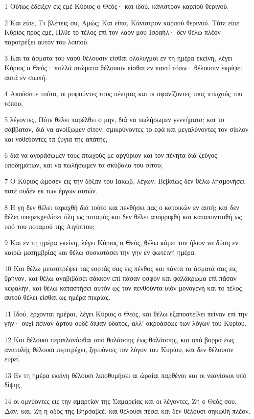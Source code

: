 \par 1 Ούτως έδειξεν εις εμέ Κύριος ο Θεός· και ιδού, κάνιστρον καρπού θερινού.
\par 2 Και είπε, Τι βλέπεις συ, Αμώς; Και είπα, Κάνιστρον καρπού θερινού. Τότε είπε Κύριος προς εμέ, Ήλθε το τέλος επί τον λαόν μου Ισραήλ· δεν θέλω πλέον παρατρέξει αυτόν του λοιπού.
\par 3 Και τα άσματα του ναού θέλουσιν είσθαι ολολυγμοί εν τη ημέρα εκείνη, λέγει Κύριος ο Θεός· πολλά πτώματα θέλουσιν είσθαι εν παντί τόπω· θέλουσιν εκρίψει αυτά εν σιωπή.
\par 4 Ακούσατε τούτο, οι ροφούντες τους πένητας και οι αφανίζοντες τους πτωχούς του τόπου,
\par 5 λέγοντες, Πότε θέλει παρέλθει ο μην, διά να πωλήσωμεν γεννήματα; και το σάββατον, διά να ανοίξωμεν σίτον, σμικρύνοντες το εφά και μεγαλύνοντες τον σίκλον και νοθεύοντες τα ζύγια της απάτης;
\par 6 διά να αγοράσωμεν τους πτωχούς με αργύριον και τον πένητα διά ζεύγος υποδημάτων, και να πωλήσωμεν τα σκύβαλα του σίτου;
\par 7 Ο Κύριος ώμοσεν εις την δόξαν του Ιακώβ, λέγων, Βεβαίως δεν θέλω λησμονήσει ποτέ ουδέν εκ των έργων αυτών.
\par 8 Η γη δεν θέλει ταραχθή διά τούτο και πενθήσει πας ο κατοικών εν αυτή; και δεν θέλει υπερεκχειλίσει όλη ως ποταμός και δεν θέλει απορριφθή και καταποντισθή ως υπό του ποταμού της Αιγύπτου;
\par 9 Και εν τη ημέρα εκείνη, λέγει Κύριος ο Θεός, θέλω κάμει τον ήλιον να δύση εν καιρώ μεσημβρίας και θέλω συσκοτάσει την γην εν φωτεινή ημέρα.
\par 10 Και θέλω μεταστρέψει τας εορτάς σας εις πένθος και πάντα τα άσματά σας εις θρήνον, και θέλω αναβιβάσει σάκκον επί πάσαν οσφύν και φαλάκρωμα επί πάσαν κεφαλήν, και θέλω καταστήσει αυτόν ως τον πενθούντα υιόν μονογενή και το τέλος αυτού θέλει είσθαι ως ημέρα πικρίας.
\par 11 Ιδού, έρχονται ημέραι, λέγει Κύριος ο Θεός, και θέλω εξαποστείλει πείναν επί την γήν· ουχί πείναν άρτου ουδέ δίψαν ύδατος, αλλ' ακροάσεως των λόγων του Κυρίου.
\par 12 Και θέλουσι περιπλανάσθαι από θαλάσσης έως θαλάσσης, και από βορρά έως ανατολής θέλουσι περιτρέχει, ζητούντες τον λόγον του Κυρίου, και δεν θέλουσιν ευρεί.
\par 13 Εν τη ημέρα εκείνη θέλουσι λιποθυμήσει αι ώραίαι παρθένοι και οι νεανίσκοι υπό δίψης,
\par 14 οι ομνύοντες εις την αμαρτίαν της Σαμαρείας και οι λέγοντες, Ζη ο Θεός σου, Δαν, και, Ζη η οδός της Βηρσαβεέ, και θέλουσι πέσει και δεν θέλουσι σηκωθή πλέον.

